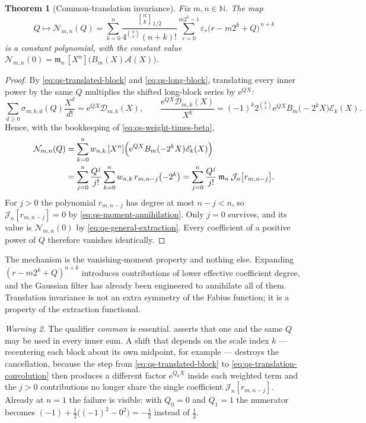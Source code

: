 \documentclass[11pt,oneside]{article}
\newtheorem{theorem}{Theorem}[section]
\theoremstyle{definition}
\theoremstyle{remark}
\newtheorem{warning}[theorem]{Warning}
\newcommand{\N}{\mathbb N}
\newcommand{\e}{\mathrm e}
\newcommand{\qbinom}[3]{\genfrac{[}{]}{0pt}{}{#1}{#2}_{#3}}
\begin{document}
\begin{theorem}[Common-translation invariance]
\label{thm:qs-translation}
Fix $m,n\in\N$.  The map
\begin{equation*}
 Q\longmapsto\mathcal N_{m,n}(Q)
 =\sum_{k=0}^{n}\frac{\qbinom nk{1/2}}{4^{\binom k2}(n+k)!}
 \sum_{r=0}^{m2^k-1}\varepsilon_r\bigl(r-m2^k+Q\bigr)^{\,n+k}
\end{equation*}
is a constant polynomial, with the constant value
$\mathcal N_{m,n}(0)=\mathfrak m_n\,[X^n]\bigl(B_m(X)\mathscr A(X)\bigr)$.
\end{theorem}

\begin{proof}
By \eqref{eq:qs-translated-block} and \eqref{eq:qs-long-block}, translating every inner power
by the same $Q$ multiplies the shifted long-block series by $\e^{QX}$:
\begin{equation*}
 \sum_{d\ge0}\sigma_{m;k,d}(Q)\frac{X^d}{d!}=\e^{QX}\mathscr D_{m,k}(X),
 \qquad
 \frac{\e^{QX}\mathscr D_{m,k}(X)}{X^k}
 =(-1)^k2^{\binom k2}\e^{QX}B_m\bigl(-2^kX\bigr)\mathscr E_k(X).
\end{equation*}
Hence, with the bookkeeping of \eqref{eq:qs-weight-times-beta},
\begin{align}
 \mathcal N_{m,n}(Q)
 &=\sum_{k=0}^{n}w_{n,k}\,[X^n]\Bigl(\e^{QX}B_m(-2^kX)\mathscr E_k(X)\Bigr) \notag\\
 &=\sum_{j=0}^{n}\frac{Q^j}{j!}
   \sum_{k=0}^{n}w_{n,k}\,r_{m,n-j}\bigl(-2^k\bigr)
 =\sum_{j=0}^{n}\frac{Q^j}{j!}\,\mathfrak m_n\,\mathcal J_n\bigl[r_{m,n-j}\bigr]. \label{eq:qs-translation-convolution}
\end{align}
For $j>0$ the polynomial $r_{m,n-j}$ has degree at most $n-j<n$, so
$\mathcal J_n[r_{m,n-j}]=0$ by \eqref{eq:qs-moment-annihilation}.  Only $j=0$ survives, and
its value is $\mathcal N_{m,n}(0)$ by \eqref{eq:qs-general-extraction}.  Every coefficient of
a positive power of $Q$ therefore vanishes identically.
\end{proof}

The mechanism is the vanishing-moment property and nothing else.  Expanding
$(r-m2^k+Q)^{n+k}$ introduces contributions of lower effective coefficient degree, and the
Gaussian filter has already been engineered to annihilate all of them.  Translation
invariance is not an extra symmetry of the Fabius function; it is a property of the
extraction functional.

\begin{warning}
\label{warn:qs-common-shift}
The qualifier \emph{common} is essential.   asserts that one and the
same $Q$ may be used in every inner sum.  A shift that depends on the scale index $k$ ---
recentering each block about its own midpoint, for example --- destroys the cancellation,
because the step from \eqref{eq:qs-translated-block} to
\eqref{eq:qs-translation-convolution} then produces a different factor $\e^{Q_kX}$ inside
each weighted term and the $j>0$ contributions no longer share the single coefficient
$\mathcal J_n[r_{m,n-j}]$.  Already at $n=1$ the failure is visible: with
$Q_0=0$ and $Q_1=1$ the numerator becomes
$(-1)+\tfrac12\bigl((-1)^2-0^2\bigr)=-\tfrac12$ instead of $\tfrac12$.
\end{warning}
\end{document}

